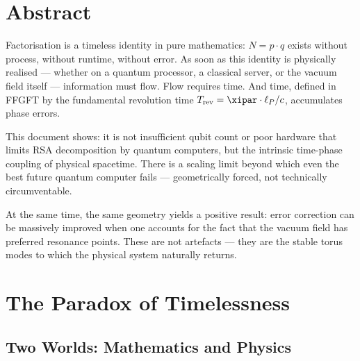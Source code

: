 
\section*{Abstract}

Factorisation is a timeless identity in pure mathematics: $N = p \cdot q$ exists
without process, without runtime, without error. As soon as this identity is
physically realised — whether on a quantum processor, a classical server, or the
vacuum field itself — information must flow. Flow requires time. And time, defined
in FFGFT by the fundamental revolution time $T_\text{rev} = \xipar \cdot \ell_P / c$,
accumulates phase errors.

This document shows: it is not insufficient qubit count or poor hardware that
limits RSA decomposition by quantum computers, but the intrinsic time-phase coupling
of physical spacetime. There is a scaling limit beyond which even the best future
quantum computer fails — geometrically forced, not technically circumventable.

At the same time, the same geometry yields a positive result: error correction can
be massively improved when one accounts for the fact that the vacuum field has
preferred resonance points. These are not artefacts — they are the stable torus
modes to which the physical system naturally returns.

\clearpage

\section{The Paradox of Timelessness}

\subsection{Two Worlds: Mathematics and Physics}

